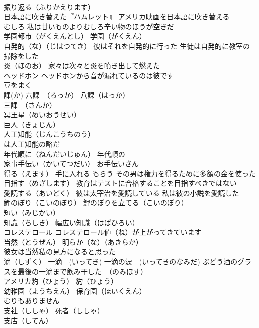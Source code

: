 \documentclass[8pt]{extreport}
\begin{document}
\begin{CJK}{UTF8}{min}
\\	振り返る（ふりかえります）
\\	日本語に吹き替えた『ハムレット』 アメリカ映画を日本語に吹き替える
\\	むしろ 私は甘いものよりむしろ辛い物のほうが空きだ
\\	学園都市（がくえんとし） 学園（がくえん）
\\	自発的（な）（じはつてき） 彼はそれを自発的に行った 生徒は自発的に教室の掃除をした
\\	炎（ほのお） 家々は次々と炎を噴き出して燃えた
\\	ヘッドホン ヘッドホンから音が漏れているのは彼です
\\	豆をまく
\\	課(か) 六課　（ろっか） 八課（はっか） 
\\	三課　（さんか）
\\	冥王星（めいおうせい）
\\	巨人（きょじん）
\\	人工知能（じんこうちのう） 
\\	は人工知能の略だ
\\	年代順に（ねんだいじゅん） 年代順の
\\	家事手伝い（かいてつだい） お手伝いさん 
\\	得る（えます） 手に入れる もらう その男は権力を得るために多額の金を使った
\\	目指す（めざします） 教育はテストに合格することを目指すべきではない
\\	愛読する（あいどく） 彼は太宰治を愛読している 私は彼の小説を愛読した
\\	鯉のぼり（こいのぼり） 鯉のぼりを立てる（こいのぼり）
\\	短い（みじかい）
\\	知識（ちしき） 幅広い知識（はばひろい）
\\	コレステロール コレステロール値（ね）が上がってきています
\\	当然（とうぜん） 明らか（な）（あきらか）
\\	彼女は当然私の見方になると思った
\\	滴（しずく） 一滴　(いってき) 一滴の涙　(いってきのなみだ) ぶどう酒のグラスを最後の一滴まで飲み干した　（のみほす）
\\	アメリカ豹（ひょう） 豹（ひょう）
\\	幼稚園（ようちえん） 保育園（ほいくえん）
\\	むりもありません 
\\	支社（ししゃ） 死者（ししゃ）
\\	支店（してん）

\end{CJK}
\end{document}
